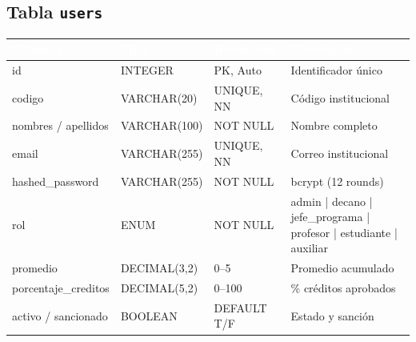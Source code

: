 \documentclass[12pt,a4paper,twoside]{report}
\begin{document}
\subsection{Tabla \texttt{users}}
\begin{center}
\begin{tabularx}{\textwidth}{|l|l|l|X|}
\hline
\rowcolor{tableHdr}
\textcolor{white}{\textbf{Columna}} & \textcolor{white}{\textbf{Tipo}} &
\textcolor{white}{\textbf{Restricción}} & \textcolor{white}{\textbf{Descripción}} \\
\hline
\rowcolor{rowOdd}id & INTEGER & PK, Auto & Identificador único \\
\hline\rowcolor{rowEven}codigo & VARCHAR(20) & UNIQUE, NN & Código institucional \\
\hline\rowcolor{rowOdd}nombres / apellidos & VARCHAR(100) & NOT NULL & Nombre completo \\
\hline\rowcolor{rowEven}email & VARCHAR(255) & UNIQUE, NN & Correo institucional \\
\hline\rowcolor{rowOdd}hashed\_password & VARCHAR(255) & NOT NULL & bcrypt (12 rounds) \\
\hline\rowcolor{rowEven}rol & ENUM & NOT NULL & admin | decano | jefe\_programa | profesor | estudiante | auxiliar \\
\hline\rowcolor{rowOdd}promedio & DECIMAL(3,2) & 0--5 & Promedio acumulado \\
\hline\rowcolor{rowEven}porcentaje\_creditos & DECIMAL(5,2) & 0--100 & \% créditos aprobados \\
\hline\rowcolor{rowOdd}activo / sancionado & BOOLEAN & DEFAULT T/F & Estado y sanción \\
\hline
\end{tabularx}
\end{center}
\end{document}
